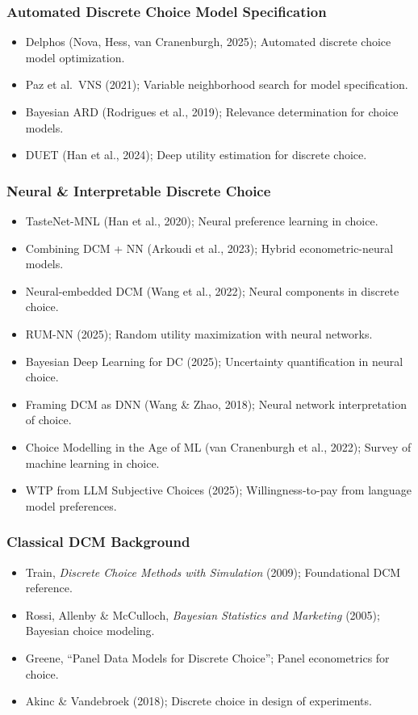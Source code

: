 \documentclass[11pt,a4paper]{article}
\begin{document}
\subsubsection{Automated Discrete Choice Model Specification}
\begin{itemize}
\item Delphos (Nova, Hess, van Cranenburgh, 2025); Automated discrete choice model optimization.
\item Paz et al.\ VNS (2021); Variable neighborhood search for model specification.
\item Bayesian ARD (Rodrigues et al., 2019); Relevance determination for choice models.
\item DUET (Han et al., 2024); Deep utility estimation for discrete choice.
\end{itemize}

\subsubsection{Neural \& Interpretable Discrete Choice}
\begin{itemize}
\item TasteNet-MNL (Han et al., 2020); Neural preference learning in choice.
\item Combining DCM + NN (Arkoudi et al., 2023); Hybrid econometric-neural models.
\item Neural-embedded DCM (Wang et al., 2022); Neural components in discrete choice.
\item RUM-NN (2025); Random utility maximization with neural networks.
\item Bayesian Deep Learning for DC (2025); Uncertainty quantification in neural choice.
\item Framing DCM as DNN (Wang \& Zhao, 2018); Neural network interpretation of choice.
\item Choice Modelling in the Age of ML (van Cranenburgh et al., 2022); Survey of machine learning in choice.
\item WTP from LLM Subjective Choices (2025); Willingness-to-pay from language model preferences.
\end{itemize}

\subsubsection{Classical DCM Background}
\begin{itemize}
\item Train, \emph{Discrete Choice Methods with Simulation} (2009); Foundational DCM reference.
\item Rossi, Allenby \& McCulloch, \emph{Bayesian Statistics and Marketing} (2005); Bayesian choice modeling.
\item Greene, ``Panel Data Models for Discrete Choice''; Panel econometrics for choice.
\item Akinc \& Vandebroek (2018); Discrete choice in design of experiments.
\end{itemize}
\end{document}
